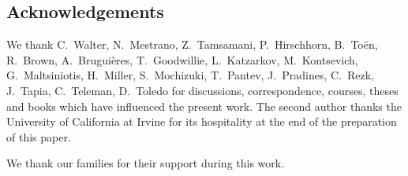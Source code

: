 \subsection*{Acknowledgements}

We thank C.~Walter, N.~Mestrano, Z.~Tamsamani, P.~Hirschhorn, B.~Toën,
R.~Brown, A.~Bruguières, T.~Goodwillie, L.~Katzarkov, M.~Kontsevich,
G.~Maltsiniotis, H.~Miller, S.~Mochizuki, T.~Pantev, J.~Pradines, C.~Rezk,
J.~Tapia, C.~Teleman, D.~Toledo for discussions, correspondence, courses,
theses and books which have influenced the present work. The second author
thanks the University of California at Irvine for its hospitality at the end
of the preparation of this paper.

We thank our families for their support during this work.
